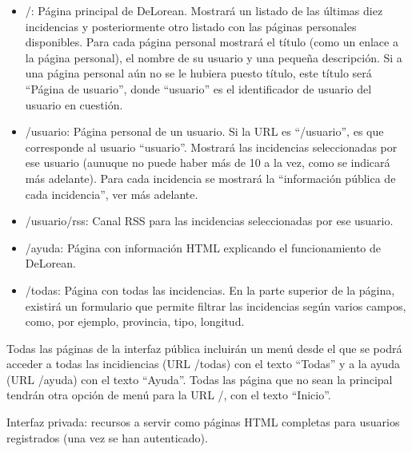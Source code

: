 \begin{itemize}
\item /: Página principal de DeLorean. Mostrará un listado de las últimas diez incidencias y posteriormente otro listado con las páginas personales disponibles. Para cada página personal mostrará el título (como un enlace a la página personal), el nombre de su usuario y una pequeña descripción. Si a una página personal aún no se le hubiera puesto título, este título será ``Página de usuario'', donde ``usuario'' es el identificador de usuario del usuario en cuestión.

\item /usuario: Página personal de un usuario. Si la URL es ``/usuario'', es que corresponde al usuario ``usuario''. Mostrará las incidencias seleccionadas por ese usuario (aunuque no puede haber más de 10 a la vez, como se indicará más adelante). Para cada incidencia se mostrará la ``información pública de cada incidencia'', ver más adelante.

\item /usuario/rss: Canal RSS para las incidencias seleccionadas por ese usuario.

\item /ayuda: Página con información HTML explicando el funcionamiento de DeLorean.

\item /todas: Página con todas las incidencias. En la parte superior de la página, existirá un formulario que permite filtrar las incidencias según varios campos, como, por ejemplo, provincia, tipo, longitud.
\end{itemize}

Todas las páginas de la interfaz pública incluirán un menú desde el que se podrá acceder a todas las incidiencias (URL /todas) con el texto ``Todas'' y a la ayuda (URL /ayuda) con el texto ``Ayuda''. Todas las página que no sean la principal tendrán otra opción de menú para la URL /, con el texto ``Inicio''.

Interfaz privada: recursos a servir como páginas HTML completas para usuarios registrados (una vez se han autenticado).

